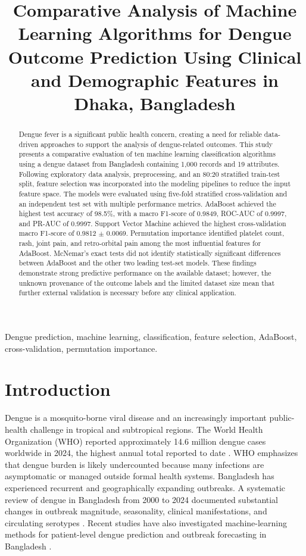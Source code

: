 \documentclass[conference]{IEEEtran}
\title{Comparative Analysis of Machine Learning Algorithms for Dengue Outcome Prediction Using Clinical and Demographic Features in Dhaka, Bangladesh}
\author{\IEEEauthorblockN{Abu Sayed Tuhin}
\IEEEauthorblockA{Department of Computer Science and Engineering\\
State University of Bangladesh\\
Dhaka, Bangladesh}}
\begin{document}
\maketitle

\begin{abstract}
Dengue fever is a significant public health concern, creating a need for reliable data-driven approaches to support the analysis of dengue-related outcomes. This study presents a comparative evaluation of ten machine learning classification algorithms using a dengue dataset from Bangladesh containing 1,000 records and 19 attributes. Following exploratory data analysis, preprocessing, and an 80:20 stratified train-test split, feature selection was incorporated into the modeling pipelines to reduce the input feature space. The models were evaluated using five-fold stratified cross-validation and an independent test set with multiple performance metrics. AdaBoost achieved the highest test accuracy of 98.5\%, with a macro F1-score of 0.9849, ROC-AUC of 0.9997, and PR-AUC of 0.9997. Support Vector Machine achieved the highest cross-validation macro F1-score of 0.9812 $\pm$ 0.0069. Permutation importance identified platelet count, rash, joint pain, and retro-orbital pain among the most influential features for AdaBoost. McNemar's exact tests did not identify statistically significant differences between AdaBoost and the other two leading test-set models. These findings demonstrate strong predictive performance on the available dataset; however, the unknown provenance of the outcome labels and the limited dataset size mean that further external validation is necessary before any clinical application.
\end{abstract}

\begin{IEEEkeywords}
Dengue prediction, machine learning, classification, feature selection, AdaBoost, cross-validation, permutation importance.
\end{IEEEkeywords}

\section{Introduction}
Dengue is a mosquito-borne viral disease and an increasingly important public-health challenge in tropical and subtropical regions. The World Health Organization (WHO) reported approximately 14.6 million dengue cases worldwide in 2024, the highest annual total reported to date \cite{who_dengue_fact}. WHO emphasizes that dengue burden is likely undercounted because many infections are asymptomatic or managed outside formal health systems. Bangladesh has experienced recurrent and geographically expanding outbreaks. A systematic review of dengue in Bangladesh from 2000 to 2024 documented substantial changes in outbreak magnitude, seasonality, clinical manifestations, and circulating serotypes \cite{sharif2024bangladesh}. Recent studies have also investigated machine-learning methods for patient-level dengue prediction and outbreak forecasting in Bangladesh \cite{bhuiyan2025early,eco2025bangladesh}.
\end{document}
